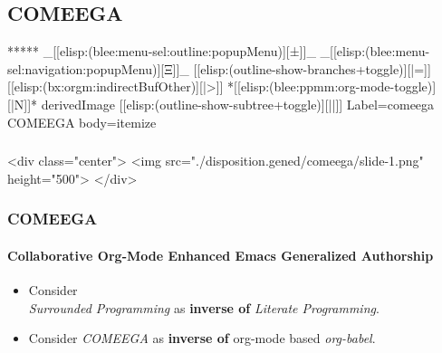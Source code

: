 \begin{whenOrg}
\section{COMEEGA}


\begin{whenOrg}
*****  _[[elisp:(blee:menu-sel:outline:popupMenu)][±]]_ _[[elisp:(blee:menu-sel:navigation:popupMenu)][Ξ]]_ [[elisp:(outline-show-branches+toggle)][|=]] [[elisp:(bx:orgm:indirectBufOther)][|>]] *[[elisp:(blee:ppmm:org-mode-toggle)][|N]]*  derivedImage [[elisp:(outline-show-subtree+toggle)][||]] Label=comeega COMEEGA body=itemize
\end{whenOrg}

\begin{htmlonly}

\begin{frame}[fragile,plain,label=comeega]
    \frametitle{}
    \framesubtitle{}
    \begin{rawhtml}
<div class="center">
<img src="./disposition.gened/comeega/slide-1.png" height="500">
</div>
    \end{rawhtml}
\end{frame}
\end{htmlonly}

\begin{verblatex}

\begin{frame}[fragile,plain,label=comeega]
    \frametitle{COMEEGA}
    \framesubtitle{Collaborative Org-Mode Enhanced Emacs Generalized Authorship}

    \begin{itemize}

      \item Consider\\ \colorbox{blue!30}{\textit{Surrounded Programming}} as \textbf{inverse of} \colorbox{blue!60}{\color{white}\textit{Literate Programming}}.


      \item Consider \colorbox{blue!30}{\textit{COMEEGA}} as \textbf{inverse of} org-mode based \colorbox{blue!60}{\color{white}\textit{org-babel}}.


\end{itemize}
\end{frame}
\end{verblatex}
\end{whenOrg}
